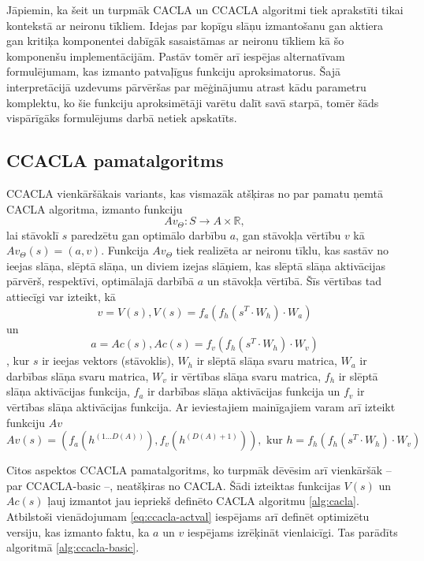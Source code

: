 \documentclass{ludis} %
\begin{document}
Jāpiemin, ka šeit un turpmāk CACLA un CCACLA algoritmi tiek aprakstīti tikai
kontekstā ar neironu tīkliem. Idejas par kopīgu slāņu izmantošanu gan aktiera
gan kritiķa komponentei dabīgāk sasaistāmas ar neironu tīkliem kā šo komponenšu
implementācijām. Pastāv tomēr arī iespējas alternatīvam formulējumam, kas
izmanto patvaļīgus funkciju aproksimatorus. Šajā interpretācijā uzdevums
pārvēršas par mēģinājumu atrast kādu parametru komplektu, ko šie funkciju
aproksimētāji varētu dalīt savā starpā, tomēr šāds vispārīgāks formulējums darbā
netiek apskatīts.

\subsection{CCACLA pamatalgoritms}
CCACLA vienkāršākais variants, kas vismazāk atšķiras no par pamatu ņemtā CACLA
algoritma, izmanto funkciju 
\begin{equation}
  Av_\Theta:S \rightarrow A \times \mathbb{R},
\end{equation}
lai stāvoklī $s$ paredzētu gan optimālo darbību $a$, gan stāvokļa vērtību $v$ kā
$Av_\Theta(s) = (a, v)$. Funkcija $Av_\Theta$ tiek realizēta ar
neironu tīklu, kas sastāv no ieejas slāņa, slēptā slāņa, un diviem izejas
slāņiem, kas slēptā slāņa aktivācijas pārvērš, respektīvi, optimālajā darbībā
$a$ un stāvokļa vērtībā. Šīs vērtības tad attiecīgi var izteikt, kā
\begin{equation}\label{eq:ccacla-act}
  v = V(s), V(s) = f_a\left(f_h(s^T \cdot W_h) \cdot W_a\right)
\end{equation} un
\begin{equation}\label{eq:ccacla-val}
  a = Ac(s), Ac(s) = f_v\left(f_h(s^T \cdot W_h) \cdot W_v\right)
\end{equation}, kur $s$ ir
ieejas vektors (stāvoklis), $W_h$ ir slēptā slāņa svaru matrica, $W_a$ ir
darbības slāņa svaru matrica, $W_v$ ir vērtības slāņa svaru matrica, $f_h$ ir
slēptā slāņa aktivācijas funkcija, $f_a$ ir darbības slāņa aktivācijas funkcija
un $f_v$ ir vērtības slāņa aktivācijas funkcija. Ar ieviestajiem mainīgajiem
varam arī izteikt funkciju $Av$
\begin{equation}\label{eq:ccacla-actval}
  Av(s) = \left(f_a(h^{(1 \ldots D(A))}), f_v(h^{(D(A) + 1)})\right), \text{ kur } 
  h = f_h\left(f_h(s^T \cdot W_h) \cdot W_v\right)
\end{equation}

Citos aspektos CCACLA pamatalgoritms, ko turpmāk dēvēsim arī vienkāršāk -- par
CCACLA-basic --, neatšķiras no CACLA. Šādi izteiktas funkcijas
$V(s)$ un $Ac(s)$ ļauj izmantot jau iepriekš definēto CACLA algoritmu
\ref{alg:cacla}. Atbilstoši vienādojumam \ref{eq:ccacla-actval} iespējams
arī definēt optimizētu versiju, kas izmanto faktu, ka $a$ un $v$ iespējams
izrēķināt vienlaicīgi. Tas parādīts algoritmā \ref{alg:ccacla-basic}.
\end{document}
